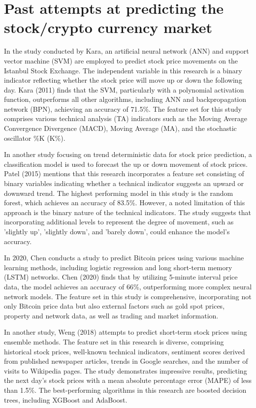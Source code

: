 \section{Past attempts at predicting the stock/crypto currency market} 

In the study conducted by Kara, an artificial neural network (ANN) and support vector machine (SVM) are employed to predict stock price movements on the Istanbul Stock Exchange. The independent variable in this research is a binary indicator reflecting whether the stock price will move up or down the following day. Kara (2011) finds that the SVM, particularly with a polynomial activation function, outperforms all other algorithms, including ANN and backpropagation network (BPN), achieving an accuracy of 71.5\%. The feature set for this study comprises various technical analysis (TA) indicators such as the Moving Average Convergence Divergence (MACD), Moving Average (MA), and the stochastic oscillator \%K (K\%).

In another study focusing on trend deterministic data for stock price prediction, a classification model is used to forecast the up or down movement of stock prices. Patel (2015) mentions that this research incorporates a feature set consisting of binary variables indicating whether a technical indicator suggests an upward or downward trend. The highest performing model in this study is the random forest, which achieves an accuracy of 83.5\%. However, a noted limitation of this approach is the binary nature of the technical indicators. The study suggests that incorporating additional levels to represent the degree of movement, such as 'slightly up', 'slightly down', and 'barely down', could enhance the model's accuracy.

In 2020, Chen conducts a study to predict Bitcoin prices using various machine learning methods, including logistic regression and long short-term memory (LSTM) networks. Chen (2020) finds that by utilizing 5-minute interval price data, the model achieves an accuracy of 66\%, outperforming more complex neural network models. The feature set in this study is comprehensive, incorporating not only Bitcoin price data but also external factors such as gold spot prices, property and network data, as well as trading and market information.

In another study, Weng (2018) attempts to predict short-term stock prices using ensemble methods. The feature set in this research is diverse, comprising historical stock prices, well-known technical indicators, sentiment scores derived from published newspaper articles, trends in Google searches, and the number of visits to Wikipedia pages. The study demonstrates impressive results, predicting the next day's stock prices with a mean absolute percentage error (MAPE) of less than 1.5\%. The best-performing algorithms in this research are boosted decision trees, including XGBoost and AdaBoost.

